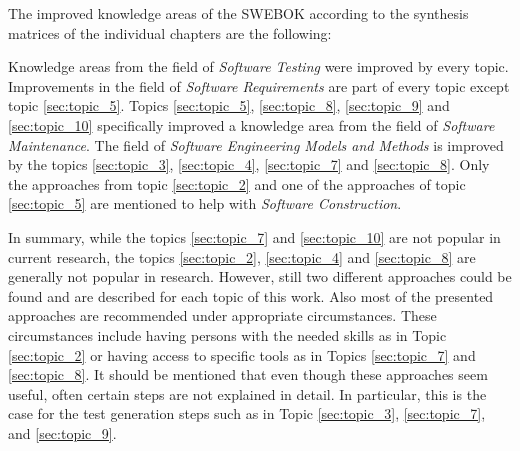 The improved knowledge areas of the SWEBOK according to the synthesis matrices of the individual chapters are the following:

Knowledge areas from the field of \textit{Software Testing} were improved by every topic. Improvements in the field of \textit{Software Requirements} are part of every topic except topic \ref{sec:topic_5}. Topics \ref{sec:topic_5}, \ref{sec:topic_8}, \ref{sec:topic_9} and \ref{sec:topic_10} specifically improved a knowledge area from the field of \textit{Software Maintenance}. The field of \textit{Software Engineering Models and Methods} is improved by the topics \ref{sec:topic_3}, \ref{sec:topic_4}, \ref{sec:topic_7} and \ref{sec:topic_8}. Only the approaches from topic \ref{sec:topic_2} and one of the approaches of topic \ref{sec:topic_5} are mentioned to help with \textit{Software Construction}.

In summary, while the topics \ref{sec:topic_7} and \ref{sec:topic_10} are not popular in current research, the topics \ref{sec:topic_2}, \ref{sec:topic_4} and \ref{sec:topic_8} are generally not popular in research. However, still two different approaches could be found and are described for each topic of this work. Also most of the presented approaches are recommended under appropriate circumstances. These circumstances include having persons with the needed skills as in Topic \ref{sec:topic_2} or having access to specific tools as in Topics \ref{sec:topic_7} and \ref{sec:topic_8}. It should be mentioned that even though these approaches seem useful, often certain steps are not explained in detail. In particular, this is the case for the test generation steps such as in Topic \ref{sec:topic_3}, \ref{sec:topic_7}, and \ref{sec:topic_9}. 
